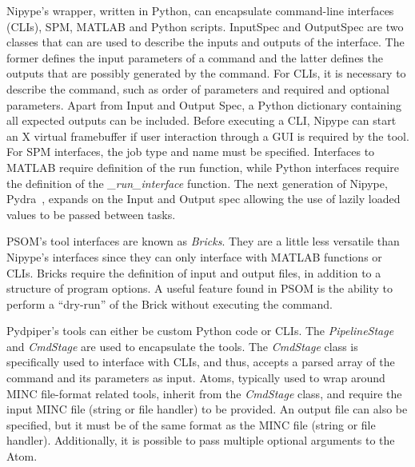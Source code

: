             Nipype's wrapper, written in Python, can encapsulate command-line
            interfaces (CLIs), SPM, MATLAB and Python scripts. InputSpec and
            OutputSpec are two classes that can are used to describe the inputs
            and outputs of the interface. The former defines the input
            parameters of a command and the latter defines the outputs that are
            possibly generated by the command. For CLIs, it is necessary to
            describe the command, such as order of parameters and required and
            optional parameters. Apart from Input and Output Spec, a Python
            dictionary containing all expected outputs can be included. Before
            executing a CLI, Nipype can start an X virtual framebuffer if user
            interaction through a GUI is required by the tool. For
            SPM interfaces, the job type and name must be specified. Interfaces
            to MATLAB require definition of the run function, while Python
            interfaces require the definition of the \textit{\_run\_interface}
            function. The next generation of Nipype, Pydra~\cite{pydra}, expands on
            the Input and Output spec allowing the use of lazily loaded values to be passed
            between tasks.
            
            PSOM’s tool interfaces are known as \textit{Bricks}. They are a
            little less versatile than Nipype's interfaces since they can only
            interface with MATLAB functions or CLIs. Bricks require the
            definition of input and output files, in addition to a structure of
            program options. A useful feature found in PSOM is the ability to
            perform a “dry-run” of the Brick without executing the command.

            Pydpiper's tools can either be custom Python code or CLIs. The
            \textit{PipelineStage} and \textit{CmdStage} are used to encapsulate
            the tools. The \textit{CmdStage} class is specifically used to
            interface with CLIs, and thus, accepts a parsed array of the command
            and its parameters as input. Atoms, typically used to wrap around
            MINC file-format related tools, inherit from the \textit{CmdStage}
            class, and require the input MINC file (string or file handler) to
            be provided. An output file can also be specified, but it must be of
            the same format as the MINC file (string or file handler).
            Additionally, it is possible to pass multiple optional arguments to
            the Atom.

